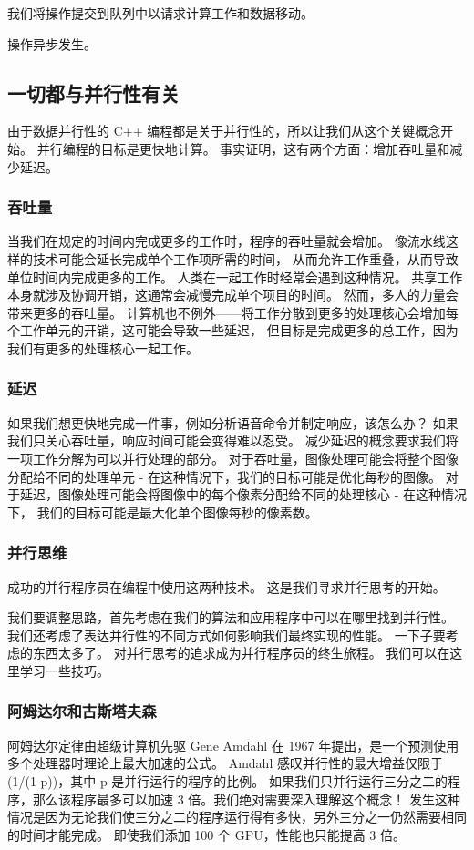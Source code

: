 \begin{remark}[队列将我们与设备连接起来]
我们将操作提交到队列中以请求计算工作和数据移动。
	
操作异步发生。
\end{remark}


\subsection{一切都与并行性有关}
由于数据并行性的 C++ 编程都是关于并行性的，所以让我们从这个关键概念开始。 
并行编程的目标是更快地计算。 事实证明，这有两个方面：增加吞吐量和减少延迟。

\subsubsection{吞吐量}
当我们在规定的时间内完成更多的工作时，程序的吞吐量就会增加。 像流水线这样的技术可能会延长完成单个工作项所需的时间，
从而允许工作重叠，从而导致单位时间内完成更多的工作。 人类在一起工作时经常会遇到这种情况。 
共享工作本身就涉及协调开销，这通常会减慢完成单个项目的时间。 然而，多人的力量会带来更多的吞吐量。 
计算机也不例外——将工作分散到更多的处理核心会增加每个工作单元的开销，这可能会导致一些延迟，
但目标是完成更多的总工作，因为我们有更多的处理核心一起工作。

\subsubsection{延迟}
如果我们想更快地完成一件事，例如分析语音命令并制定响应，该怎么办？ 如果我们只关心吞吐量，响应时间可能会变得难以忍受。 
减少延迟的概念要求我们将一项工作分解为可以并行处理的部分。 
对于吞吐量，图像处理可能会将整个图像分配给不同的处理单元 - 在这种情况下，我们的目标可能是优化每秒的图像。 
对于延迟，图像处理可能会将图像中的每个像素分配给不同的处理核心 - 在这种情况下，
我们的目标可能是最大化单个图像每秒的像素数。

\subsubsection{并行思维}
成功的并行程序员在编程中使用这两种技术。 这是我们寻求并行思考的开始。

我们要调整思路，首先考虑在我们的算法和应用程序中可以在哪里找到并行性。 
我们还考虑了表达并行性的不同方式如何影响我们最终实现的性能。 一下子要考虑的东西太多了。 
对并行思考的追求成为并行程序员的终生旅程。 我们可以在这里学习一些技巧。

\subsubsection{阿姆达尔和古斯塔夫森}
阿姆达尔定律由超级计算机先驱 Gene Amdahl 在 1967 年提出，是一个预测使用多个处理器时理论上最大加速的公式。 
Amdahl 感叹并行性的最大增益仅限于 (1/(1-p))，其中 p 是并行运行的程序的比例。 
如果我们只并行运行三分之二的程序，那么该程序最多可以加速 3 倍。我们绝对需要深入理解这个概念！ 
发生这种情况是因为无论我们使三分之二的程序运行得有多快，另外三分之一仍然需要相同的时间才能完成。 
即使我们添加 100 个 GPU，性能也只能提高 3 倍。

